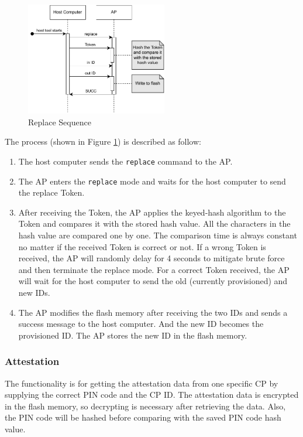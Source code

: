 \documentclass[11pt,oneside,onecolumn,letterpaper]{article}
\newcounter{alg}
\begin{document}
	\begin{figure}[h]
		\centering
		\includegraphics[width=0.55\textwidth]{pics/replace.pdf}
		\caption{Replace Sequence}
		\label{fig:functionality_replace}
	\end{figure}
	
	The process (shown in Figure \ref{fig:functionality_replace}) is described as follow:
	
	\begin{enumerate}
		\item The host computer sends the \texttt{replace} command to the AP.
		\item The AP enters the \texttt{replace} mode and waits for the host computer to send the replace Token.
		\item After receiving the Token,
		the AP applies the keyed-hash algorithm to the Token and compares it with the stored hash value.
		All the characters in the hash value are compared one by one.
		The comparison time is always constant no matter if the received Token is correct or not.
		If a wrong Token is received,
		the AP will randomly delay for 4 seconds to mitigate brute force and then terminate the replace mode.
		For a correct Token received,
		the AP will wait for the host computer to send the old (currently provisioned) and new IDs.
		\item The AP modifies the flash memory after receiving the two IDs and sends a success message to the host computer.
		And the new ID becomes the provisioned ID.
		The AP stores the new ID in the flash memory.
	\end{enumerate}
	
	\subsubsection{Attestation}
	The functionality is for getting the attestation data from one specific CP by supplying the correct PIN code and the CP ID.
	The attestation data is encrypted in the flash memory,
	so decrypting is necessary after retrieving the data.
	Also,
	the PIN code will be hashed before comparing with the saved PIN code hash value.
	
\end{document}
